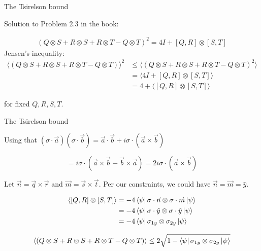\documentclass[aspectratio=1610]{beamer}					%
\begin{document}
\begin{frame}{The Tsirelson bound}

Solution to Problem 2.3 in the book:

\begin{align*}
(Q\otimes S + R\otimes S  + R\otimes T  - Q\otimes T)^{2} = 4I + [Q,R]\otimes [S,T]
\end{align*}
Jensen's inequality:
\begin{align*}
\langle(Q\otimes S + R\otimes S  + R\otimes T  - Q\otimes T)\rangle^{2} &\leq \langle(Q\otimes S + R\otimes S  + R\otimes T  - Q\otimes T)^{2}\rangle \\
&= \langle 4I + [Q,R]\otimes [S,T]\rangle \\
&= 4 + \langle [Q,R]\otimes [S,T]\rangle
\end{align*}

for fixed $Q,R,S,T$.

\end{frame}

\begin{frame}{The Tsirelson bound}

Using that $(\sigma\cdot \vec{a})(\sigma\cdot \vec{b}) = \vec{a}\cdot \vec{b} + i\sigma\cdot(\vec{a}\times \vec{b})$

\begin{equation*}
[A,B] = i\sigma\cdot(\vec{a}\times\vec{b} - \vec{b}\times\vec{a}) = 2i\sigma\cdot(\vec{a}\times\vec{b})
\end{equation*}

Let $\vec{n} = \vec{q}\times\vec{r}$ and $\vec{m} = \vec{s}\times\vec{t}$. Per our constraints, we could have $\vec{n} = \vec{m} = \hat{y}$.

\begin{align*}
\langle [Q,R]\otimes [S,T]\rangle &= -4\bra{\psi}\sigma\cdot\vec{n}\otimes\sigma\cdot\vec{m}\ket{\psi}\\
&= -4\bra{\psi}\sigma\cdot\hat{y}\otimes\sigma\cdot\hat{y}\ket{\psi}\\
&= -4\bra{\psi}\sigma_{1y}\otimes\sigma_{2y}\ket{\psi}
\end{align*}

\begin{align*}
\langle(Q\otimes S + R\otimes S  + R\otimes T  - Q\otimes T)\rangle \leq 2\sqrt{1-\bra{\psi}\sigma_{1y}\otimes\sigma_{2y}\ket{\psi}}
\end{align*}

\end{frame}
\end{document}
